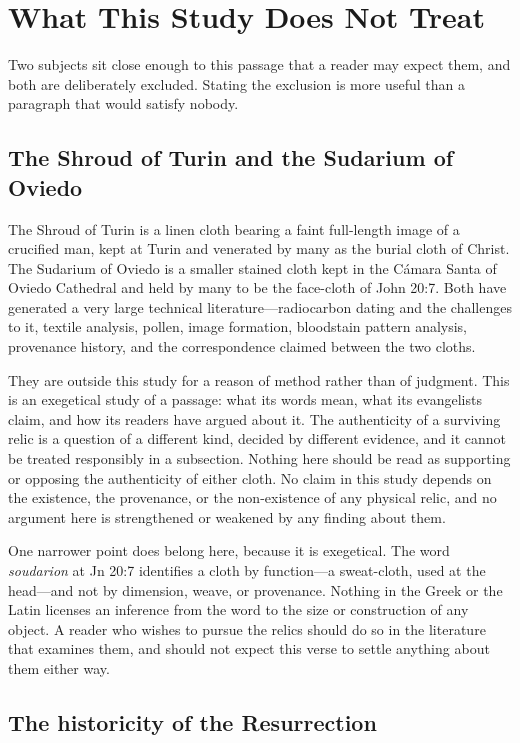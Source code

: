 \section{What This Study Does Not Treat}

Two subjects sit close enough to this passage that a reader may expect them, and
both are deliberately excluded. Stating the exclusion is more useful than a
paragraph that would satisfy nobody.

\subsection{The Shroud of Turin and the Sudarium of Oviedo}

The Shroud of Turin is a linen cloth bearing a faint full-length image of a
crucified man, kept at Turin and venerated by many as the burial cloth of
Christ. The Sudarium of Oviedo is a smaller stained cloth kept in the C\'amara
Santa of Oviedo Cathedral and held by many to be the face-cloth of John 20:7.
Both have generated a very large technical literature---radiocarbon dating and
the challenges to it, textile analysis, pollen, image formation, bloodstain
pattern analysis, provenance history, and the correspondence claimed between
the two cloths.

They are outside this study for a reason of method rather than of judgment.
This is an exegetical study of a passage: what its words mean, what its
evangelists claim, and how its readers have argued about it. The authenticity
of a surviving relic is a question of a different kind, decided by different
evidence, and it cannot be treated responsibly in a subsection. Nothing here
should be read as supporting or opposing the authenticity of either cloth. No
claim in this study depends on the existence, the provenance, or the
non-existence of any physical relic, and no argument here is strengthened or
weakened by any finding about them.

One narrower point does belong here, because it is exegetical. The word
\emph{soudarion} at Jn 20:7 identifies a cloth by function---a sweat-cloth,
used at the head---and not by dimension, weave, or provenance. Nothing in the
Greek or the Latin licenses an inference from the word to the size or
construction of any object. A reader who wishes to pursue the relics should do
so in the literature that examines them, and should not expect this verse to
settle anything about them either way.

\subsection{The historicity of the Resurrection}

